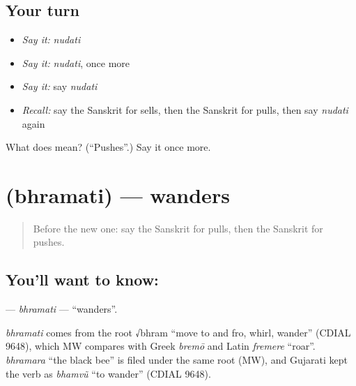 \subsection*{Your turn}
\begin{itemize}
\raggedright
  \item \emph{Say it:} \emph{nudati}
  \item \emph{Say it:} \emph{nudati}, once more
  \item \emph{Say it:} say \emph{nudati}
  \item \emph{Recall:} say the Sanskrit for sells, then the Sanskrit for pulls, then say \emph{nudati} again
\end{itemize}

\begin{tcolorbox}[breakable,colback=teal!4,colframe=teal!35!black,title={Before you move on}]
What does  mean? (\textquotedblleft{}Pushes\textquotedblright{}.) Say it once more.
\end{tcolorbox}
\section[\texorpdfstring{\sk{भ्रमति} (bhramati)}{भ्रमति (bhramati)}]{ (bhramati) — wanders}

\label{lesson:SA-C138-bhramati}



\begin{quote}
Before the new one: say the Sanskrit for pulls, then the Sanskrit for pushes.
\end{quote}

\subsection*{You'll want to know: }
\textbf{} — \emph{bhramati} — \textquotedblleft{}wanders\textquotedblright{}.

\begin{cousinweb}
\emph{bhramati} comes from the root √bhram \textquotedblleft{}move to and fro, whirl, wander\textquotedblright{} (CDIAL 9648), which MW compares with Greek \emph{bremō} and Latin \emph{fremere} \textquotedblleft{}roar\textquotedblright{}. \emph{bhramara} \textquotedblleft{}the black bee\textquotedblright{} is filed under the same root (MW), and Gujarati kept the verb as \emph{bhamvũ} \textquotedblleft{}to wander\textquotedblright{} (CDIAL 9648).
\end{cousinweb}


